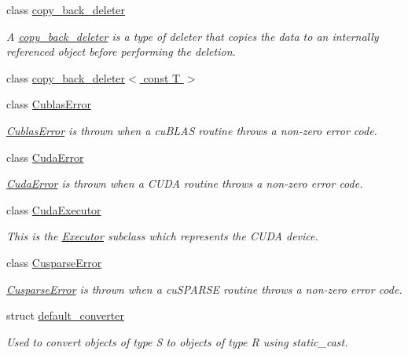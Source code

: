 \begin{DoxyCompactItemize}
class \hyperlink{classgko_1_1copy__back__deleter}{copy\+\_\+back\+\_\+deleter}
\begin{DoxyCompactList}\small\item\em A \hyperlink{classgko_1_1copy__back__deleter}{copy\+\_\+back\+\_\+deleter} is a type of deleter that copies the data to an internally referenced object before performing the deletion. \end{DoxyCompactList}\item 
class \hyperlink{classgko_1_1copy__back__deleter_3_01const_01T_01_4}{copy\+\_\+back\+\_\+deleter$<$ const T $>$}
\item 
class \hyperlink{classgko_1_1CublasError}{Cublas\+Error}
\begin{DoxyCompactList}\small\item\em \hyperlink{classgko_1_1CublasError}{Cublas\+Error} is thrown when a cu\+B\+L\+AS routine throws a non-\/zero error code. \end{DoxyCompactList}\item 
class \hyperlink{classgko_1_1CudaError}{Cuda\+Error}
\begin{DoxyCompactList}\small\item\em \hyperlink{classgko_1_1CudaError}{Cuda\+Error} is thrown when a C\+U\+DA routine throws a non-\/zero error code. \end{DoxyCompactList}\item 
class \hyperlink{classgko_1_1CudaExecutor}{Cuda\+Executor}
\begin{DoxyCompactList}\small\item\em This is the \hyperlink{classgko_1_1Executor}{Executor} subclass which represents the C\+U\+DA device. \end{DoxyCompactList}\item 
class \hyperlink{classgko_1_1CusparseError}{Cusparse\+Error}
\begin{DoxyCompactList}\small\item\em \hyperlink{classgko_1_1CusparseError}{Cusparse\+Error} is thrown when a cu\+S\+P\+A\+R\+SE routine throws a non-\/zero error code. \end{DoxyCompactList}\item 
struct \hyperlink{structgko_1_1default__converter}{default\+\_\+converter}
\begin{DoxyCompactList}\small\item\em Used to convert objects of type {\ttfamily S} to objects of type {\ttfamily R} using static\+\_\+cast. \end{DoxyCompactList}\item 

\end{DoxyCompactItemize}
